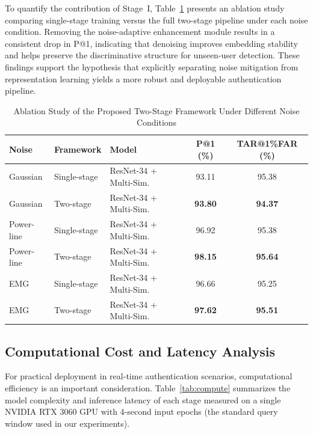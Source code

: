 \documentclass[conference]{IEEEtran}
\begin{document}
To quantify the contribution of Stage~I, Table~\ref{tab:ablation} presents an ablation study comparing single-stage training versus the full two-stage pipeline under each noise condition. Removing the noise-adaptive enhancement module results in a consistent drop in P@1, indicating that denoising improves embedding stability and helps preserve the discriminative structure for unseen-user detection. These findings support the hypothesis that explicitly separating noise mitigation from representation learning yields a more robust and deployable authentication pipeline.

\begin{table}[htbp]
\caption{Ablation Study of the Proposed Two-Stage Framework Under Different Noise Conditions}
\label{tab:ablation}
\begin{center}
\begin{tabular}{lllcc}
\toprule
\textbf{Noise} & \textbf{Framework} & \textbf{Model} & \textbf{P@1 (\%)} & \textbf{TAR@1\%FAR (\%)} \\
\midrule
Gaussian   & Single-stage & ResNet-34 + Multi-Sim. & 93.11 & 95.38 \\
Gaussian   & Two-stage    & ResNet-34 + Multi-Sim. & \textbf{93.80} & \textbf{94.37} \\
\midrule
Power-line & Single-stage & ResNet-34 + Multi-Sim. & 96.92 & 95.38 \\
Power-line & Two-stage    & ResNet-34 + Multi-Sim. & \textbf{98.15} & \textbf{95.64} \\
\midrule
EMG        & Single-stage & ResNet-34 + Multi-Sim. & 96.66 & 95.25 \\
EMG        & Two-stage    & ResNet-34 + Multi-Sim. & \textbf{97.62} & \textbf{95.51} \\
\bottomrule
\end{tabular}
\end{center}
\end{table}

\subsection{Computational Cost and Latency Analysis}

For practical deployment in real-time authentication scenarios, computational efficiency is an important consideration. Table~\ref{tab:compute} summarizes the model complexity and inference latency of each stage measured on a single NVIDIA RTX 3060 GPU with 4-second input epochs (the standard query window used in our experiments).
\end{document}
